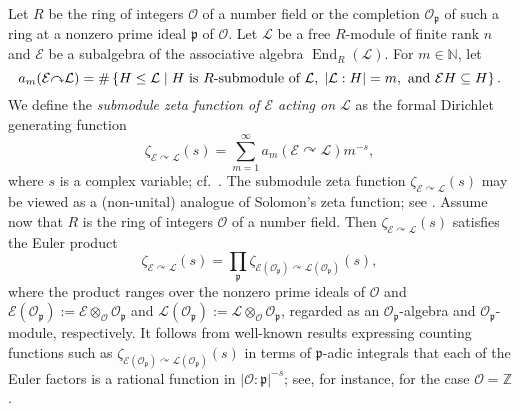 \documentclass[11pt]{amsart}
\numberwithin{equation}{section}
\numberwithin{figure}{section}
\theoremstyle{plain}
\theoremstyle{definition}
\theoremstyle{remark}
\begin{document}
Let $R$ be the ring of integers ${\mathcal{O}}$ of a number field or the
completion ${\mathcal{O}}_{\mathfrak{p}}$ of such a ring at a nonzero prime ideal
${\mathfrak{p}}$ of ${\mathcal{O}}$. Let ${\ensuremath{\mathcal{L}}}$ be a free $R$-module of finite rank $n$
and ${\mathcal{E}}$ be a subalgebra of the associative algebra $\operatorname{End}_R({\ensuremath{\mathcal{L}}})$.
For $m\in{\ensuremath{\mathbb{N}}}$, let
$$a_m({\mathcal{E}}{\curvearrowright} {\ensuremath{\mathcal{L}}}) = \#\left\{ H\leq {\ensuremath{\mathcal{L}}} \mid H \textup{ is
  $R$-submodule of ${\ensuremath{\mathcal{L}}}$},\; |{\ensuremath{\mathcal{L}}}:H| = m,\textup{ and } {\mathcal{E}} H
\subseteq H \right\}.$$ We define the \emph{submodule zeta function of
  ${\mathcal{E}}$ acting on ${\ensuremath{\mathcal{L}}}$} as the formal Dirichlet generating function
$$\zeta_{{\mathcal{E}}{\curvearrowright} {\ensuremath{\mathcal{L}}}}(s) = \sum_{m=1}^\infty a_m({\mathcal{E}}{\curvearrowright}
{\ensuremath{\mathcal{L}}})m^{-s},$$ where $s$ is a complex variable; cf.\
\cite[Definition~2.1]{Rossmann/15}. The submodule zeta function
$\zeta_{{\mathcal{E}}{\curvearrowright} {\ensuremath{\mathcal{L}}}}(s)$ may be viewed as a (non-unital) analogue of
Solomon's zeta function; see \cite{Solomon/77}.  Assume now that $R$
is the ring of integers ${\ensuremath{\mathcal{O}}}$ of a number field. Then
$\zeta_{{\mathcal{E}}{\curvearrowright} {\ensuremath{\mathcal{L}}}}(s)$ satisfies the Euler product
\begin{equation}\label{equ:euler}
\zeta_{{\mathcal{E}}{\curvearrowright} {\ensuremath{\mathcal{L}}}}(s) = \prod_{\mathfrak{p}} \zeta_{{\mathcal{E}}({\ensuremath{\mathcal{O}}}_{\mathfrak{p}}){\curvearrowright} {\ensuremath{\mathcal{L}}}({\ensuremath{\mathcal{O}}}_{\mathfrak{p}})}(s),
\end{equation}
where the product ranges over the nonzero prime ideals of ${\mathcal{O}}$ and
${\mathcal{E}}({\ensuremath{\mathcal{O}}}_{\mathfrak{p}}) := {\mathcal{E}} \otimes_{\mathcal{O}} {\mathcal{O}}_{\mathfrak{p}}$ and
${\ensuremath{\mathcal{L}}}({\ensuremath{\mathcal{O}}}_{\mathfrak{p}}) := {\ensuremath{\mathcal{L}}} \otimes_{\mathcal{O}} {\mathcal{O}}_{\mathfrak{p}}$, regarded as an
${\ensuremath{\mathcal{O}}}_{\mathfrak{p}}$-algebra and ${\ensuremath{\mathcal{O}}}_{\mathfrak{p}}$-module, respectively. It
follows from well-known results expressing counting functions such as
$\zeta_{{\mathcal{E}}({\ensuremath{\mathcal{O}}}_{\mathfrak{p}}){\curvearrowright} {\ensuremath{\mathcal{L}}}({\ensuremath{\mathcal{O}}}_{\mathfrak{p}})}(s)$ in terms of
${\mathfrak{p}}$-adic integrals that each of the Euler factors is a rational
function in $|{\ensuremath{\mathcal{O}}}:{\mathfrak{p}}|^{-s}$; see, for instance, \cite{duSG/00} for
the case ${\ensuremath{\mathcal{O}}}={\ensuremath{\mathbb{Z}}}$.
\end{document}
